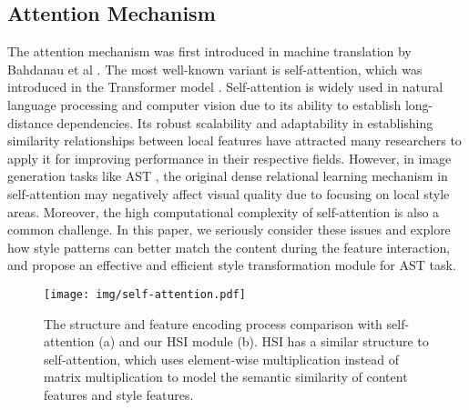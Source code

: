 \subsection{Attention Mechanism}
The attention mechanism was first introduced in machine translation by Bahdanau et al \cite{att2015}. The most well-known variant is self-attention, which was introduced in the Transformer model \cite{transformer}. Self-attention is widely used in natural language processing \cite{nlp_att1,nlp_att2,nlp_att3,nlp_att4} and computer vision \cite{cv_att1,cv_att2,cv_att3,cv_att4} due to its ability to establish long-distance dependencies. 
Its robust scalability and adaptability in establishing similarity relationships between local features have attracted many researchers to apply it for improving performance in their respective fields.
However, in image generation tasks like AST \cite{sanet,adaattn}, 
the original dense relational learning mechanism in self-attention may negatively affect visual quality due to focusing on local style areas.
Moreover, the high computational complexity of self-attention is also a common challenge. 
In this paper, we seriously consider these issues and explore how style patterns can better match the content during the feature interaction, and propose an effective and efficient style transformation module for AST task.


\begin{figure*} [t!]
\centering
\setlength{\abovecaptionskip}{-0.3cm}
\texttt{[image: img/self-attention.pdf]}
\caption{The structure and feature encoding process comparison with self-attention (a) and our HSI module (b). HSI has a similar structure to self-attention, which uses element-wise multiplication instead of matrix multiplication to model the semantic similarity of content features and style features.}
\label{self_att}
\vspace{-0.5cm}
\end{figure*}